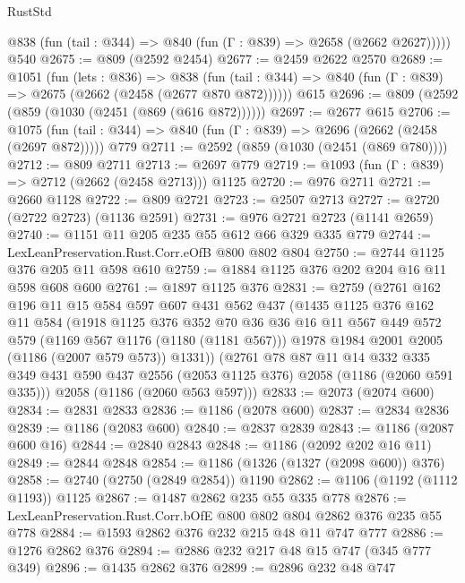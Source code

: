 \begin{lexlean}{RustStd}
\begin{coremodule}
      @838 (fun (tail : @344) => @840 (fun (Γ : @839) => @2658 (@2662 @2627)))))
    @540
@2675 := @809 (@2592 @2454)
@2677 := @2459 @2622 @2570
@2689 := @1051
    (fun (lets : @836) =>
    @838 (fun (tail : @344) => @840 (fun (Γ : @839) => @2675 (@2662 (@2458 (@2677 @870 @872))))))
    @615
@2696 := @809 (@2592 (@859 (@1030 (@2451 (@869 (@616 @872))))))
@2697 := @2677 @615
@2706 := @1075
    (fun (tail : @344) => @840 (fun (Γ : @839) => @2696 (@2662 (@2458 (@2697 @872)))))
    @779
@2711 := @2592 (@859 (@1030 (@2451 (@869 @780))))
@2712 := @809 @2711
@2713 := @2697 @779
@2719 := @1093 (fun (Γ : @839) => @2712 (@2662 (@2458 @2713))) @1125
@2720 := @976 @2711
@2721 := @2660 @1128
@2722 := @809 @2721
@2723 := @2507 @2713
@2727 := @2720 (@2722 @2723) (@1136 @2591)
@2731 := @976 @2721 @2723 (@1141 @2659)
@2740 := @1151 @11 @205 @235 @55 @612 @66 @329 @335 @779
@2744 := LexLeanPreservation.Rust.Corr.eOfB @800 @802 @804
@2750 := @2744 @1125 @376 @205 @11 @598 @610
@2759 := @1884 @1125 @376 @202 @204 @16 @11 @598 @608 @600
@2761 := @1897 @1125 @376
@2831 := @2759
    (@2761
      @162
      @196
      @11
      @15
      @584
      @597
      @607
      @431
      @562
      @437
      (@1435
        @1125
        @376
        @162
        @11
        @584
        (@1918
          @1125
          @376
          @352
          @70
          @36
          @36
          @16
          @11
          @567
          @449
          @572
          @579
          (@1169 @567 @1176 (@1180 (@1181 @567)))
          @1978
          @1984
          @2001
          @2005
          (@1186 (@2007 @579 @573))
          @1331))
      (@2761
        @78
        @87
        @11
        @14
        @332
        @335
        @349
        @431
        @590
        @437
        @2556
        (@2053 @1125 @376)
        @2058
        (@1186 (@2060 @591 @335)))
      @2058
      (@1186 (@2060 @563 @597)))
@2833 := @2073 (@2074 @600)
@2834 := @2831 @2833
@2836 := @1186 (@2078 @600)
@2837 := @2834 @2836
@2839 := @1186 (@2083 @600)
@2840 := @2837 @2839
@2843 := @1186 (@2087 @600 @16)
@2844 := @2840 @2843
@2848 := @1186 (@2092 @202 @16 @11)
@2849 := @2844 @2848
@2854 := @1186 (@1326 (@1327 (@2098 @600)) @376)
@2858 := @2740 (@2750 (@2849 @2854)) @1190
@2862 := @1106 (@1192 (@1112 @1193)) @1125
@2867 := @1487 @2862 @235 @55 @335 @778
@2876 := LexLeanPreservation.Rust.Corr.bOfE @800 @802 @804 @2862 @376 @235 @55 @778
@2884 := @1593 @2862 @376 @232 @215 @48 @11 @747 @777
@2886 := @1276 @2862 @376
@2894 := @2886 @232 @217 @48 @15 @747 (@345 @777 @349)
@2896 := @1435 @2862 @376
@2899 := @2896 @232 @48 @747

\end{coremodule}
\end{lexlean}
